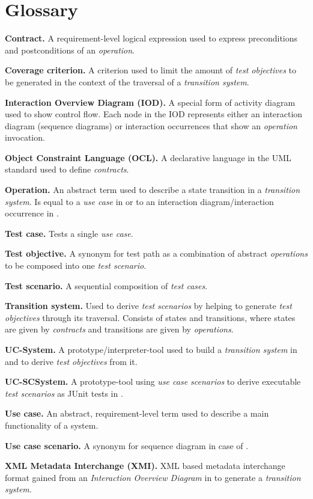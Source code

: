\chapter{Glossary} \label{glossary}

\textbf{Contract.} A requirement-level logical expression used to express preconditions and postconditions of an \textit{operation}.

\textbf{Coverage criterion.} A criterion used to limit the amount of \textit{test objectives} to be generated in the context of the traversal of a \textit{transition system}. 

\textbf{Interaction Overview Diagram (IOD).} A special form of activity diagram used to show control flow. Each node in the IOD represents either an interaction diagram (sequence diagrams) or interaction occurrences that show an \textit{operation} invocation.

\textbf{Object Constraint Language (OCL).} A declarative language in the UML standard used to define \textit{contracts}. 

\textbf{Operation.} An abstract term used to describe a state transition in a \textit{transition system}. Is equal to a \textit{use case} in \cite{ClementineNebut2006} or to an interaction diagram/interaction occurrence in \cite{NajlaRaza2007}.

\textbf{Test case.} Tests a single \textit{use case}.

\textbf{Test objective.} A synonym for test path as a combination of abstract \textit{operations} to be composed into one \textit{test scenario}. 

\textbf{Test scenario.} A sequential composition of \textit{test cases}.

\textbf{Transition system.} Used to derive \textit{test scenarios} by helping to generate \textit{test objectives} through its traversal. Consists of states and transitions, where states are given by \textit{contracts} and transitions are given by \textit{operations}. 

\textbf{UC-System.} A prototype/interpreter-tool used to build a \textit{transition system} in \cite{ClementineNebut2006} and to derive \textit{test objectives} from it. 

\textbf{UC-SCSystem.} A prototype-tool using \textit{use case scenarios} to derive executable \textit{test scenarios} as JUnit tests in \cite{ClementineNebut2006}. 

\textbf{Use case.} An abstract, requirement-level term used to describe a main functionality of a system.

\textbf{Use case scenario.} A synonym for sequence diagram in case of \cite{ClementineNebut2006}.

\textbf{XML Metadata Interchange (XMI).} XML based metadata interchange format gained from an \textit{Interaction Overview Diagram} in \cite{NajlaRaza2007} to generate a \textit{transition system}.

